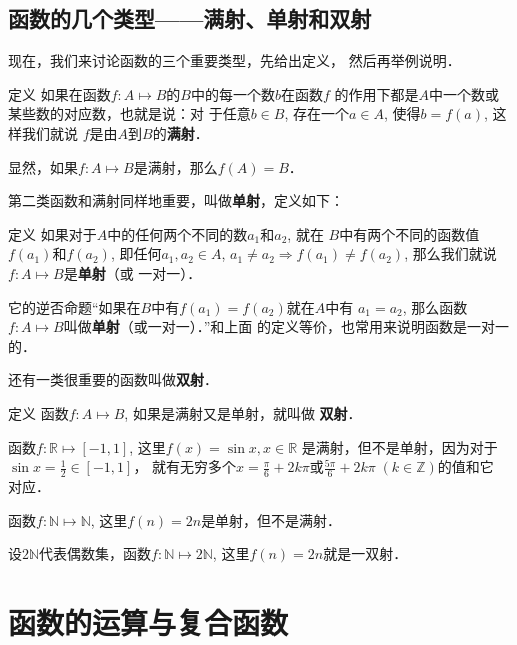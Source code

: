 \subsection{函数的几个类型——满射、单射和双射}
现在，我们来讨论函数的三个重要类型，先给出定义，
然后再举例说明．

\begin{blk}{定义 }
   如果在函数$f:A\mapsto B$的$B$中的每一个数$b$在函数$f$
的作用下都是$A$中一个数或某些数的对应数，也就是说：对
于任意$b\in B$, 存在一个$a\in A$, 使得$b=f(a)$, 这样我们就说
$f$是由$A$到$B$的\textbf{满射}．
\end{blk}

显然，如果$f:A\mapsto B$是满射，那么$f(A)=B$．

第二类函数和满射同样地重要，叫做\textbf{单射}，定义如下：

\begin{blk}{定义}
    如果对于$A$中的任何两个不同的数$a_1$和$a_2$, 就在
$B$中有两个不同的函数值$f(a_1)$和$f(a_2)$, 即任何$a_1,a_2\in A$,
$a_1\ne a_2\Rightarrow f(a_1)\ne f(a_2)$, 那么我们就说$f:A\mapsto B$是\textbf{单射}（或
一对一）．
\end{blk}

 
它的逆否命题“如果在$B$中有$f(a_1)=f(a_2)$就在$A$中有
$a_1=a_2$, 那么函数$f:A\mapsto B$叫做\textbf{单射}（或一对一）．”和上面
的定义等价，也常用来说明函数是一对一的．

还有一类很重要的函数叫做\textbf{双射}．

\begin{blk}{定义}
    函数$f:A\mapsto B$, 如果是满射又是单射，就叫做
    \textbf{双射}．
\end{blk}

\begin{example}
    函数$f:\mathbb{R}\mapsto [-1,1]$, 这里$f(x)=\sin x, x\in\mathbb{R}$
是满射，但不是单射，因为对于
$\sin x=\frac{1}{2}\in [-1,1]$，
就有无穷多个$x=\frac{\pi}{6}+2k\pi$或$\frac{5\pi}{6}+2k\pi\;(k\in\mathbb{Z})$的值和它
对应．
\end{example}

\begin{example}
    函数$f:\mathbb{N}\mapsto\mathbb{N}$, 这里$f(n)=2n$是单射，但不是满射．
\end{example}

\begin{example}
    设$2\mathbb{N}$代表偶数集，函数$f:\mathbb{N}\mapsto 2 \mathbb{N}$, 这里$f(n)=2n$就是一双射．
\end{example}

\section{函数的运算与复合函数}

